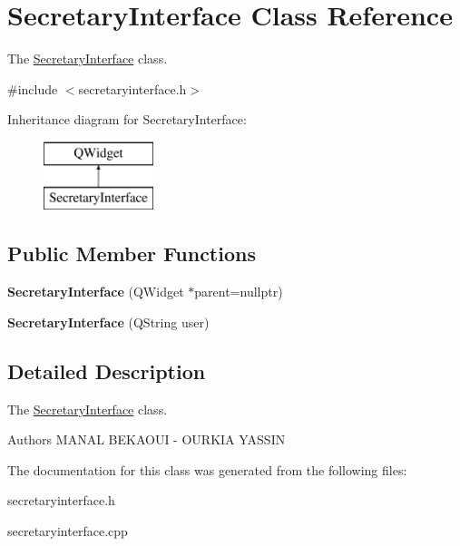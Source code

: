 \hypertarget{class_secretary_interface}{}\section{Secretary\+Interface Class Reference}
\label{class_secretary_interface}


The \mbox{\hyperlink{class_secretary_interface}{Secretary\+Interface}} class.  




{\ttfamily \#include $<$secretaryinterface.\+h$>$}

Inheritance diagram for Secretary\+Interface\+:\begin{figure}[H]
\begin{center}
\leavevmode
\includegraphics[height=2.000000cm]{class_secretary_interface}
\end{center}
\end{figure}
\subsection*{Public Member Functions}
\begin{DoxyCompactItemize}
\item 
\mbox{\label{class_secretary_interface_a821c94f865a2dc52e3c1e395202009b3}} 
{\bfseries Secretary\+Interface} (Q\+Widget $\ast$parent=nullptr)
\item 
\mbox{\label{class_secretary_interface_a9b2090ba8b53b60df97e0897400044cb}} 
{\bfseries Secretary\+Interface} (Q\+String user)
\end{DoxyCompactItemize}


\subsection{Detailed Description}
The \mbox{\hyperlink{class_secretary_interface}{Secretary\+Interface}} class. 

\begin{DoxyAuthor}{Authors}
M\+A\+N\+AL B\+E\+K\+A\+O\+UI -\/ O\+U\+R\+K\+IA Y\+A\+S\+S\+IN 
\end{DoxyAuthor}


The documentation for this class was generated from the following files\+:\begin{DoxyCompactItemize}
\item 
secretaryinterface.\+h\item 
secretaryinterface.\+cpp\end{DoxyCompactItemize}
